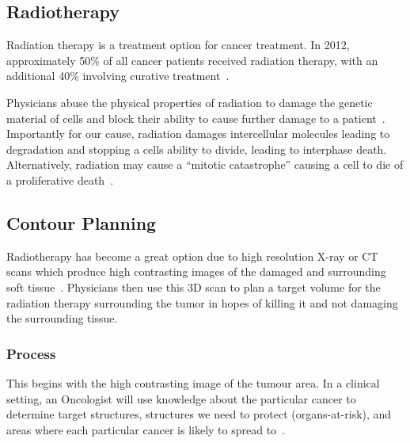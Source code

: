 \documentclass[11pt,twoside]{report}
\begin{document}
\subsection{Radiotherapy}\label{sect:radiotherapy}

Radiation therapy is a treatment option for cancer treatment. In 2012, approximately 50\% of all cancer patients received radiation therapy, with an additional 40\% involving curative treatment~\cite{radiotherapy-advances}. 

Physicians abuse the physical properties of radiation to damage the genetic material of cells and block their ability to cause further damage to a patient~\cite{radiotherapy-advances}. Importantly for our cause, radiation damages intercellular molecules leading to degradation and stopping a cells ability to divide, leading to interphase death. Alternatively, radiation may cause a ``mitotic catastrophe'' causing a cell to die of a proliferative death~\cite{cell-death}. 

\subsection{Contour Planning}\label{sect:contour-planning}

Radiotherapy has become a great option due to high resolution X-ray or CT scans which produce high contrasting images of the damaged and surrounding soft tissue~\cite{radiotherapy-basic-concepts}. Physicians then use this 3D scan to plan a target volume for the radiation therapy surrounding the tumor in hopes of killing it and not damaging the surrounding tissue.

\subsubsection{Process}

This begins with the high contrasting image of the tumour area. In a clinical setting, an Oncologist will use knowledge about the particular cancer to determine target structures, structures we need to protect (organs-at-risk), and areas where each particular cancer is likely to spread to~\cite{AMLART-data}. 
\end{document}
